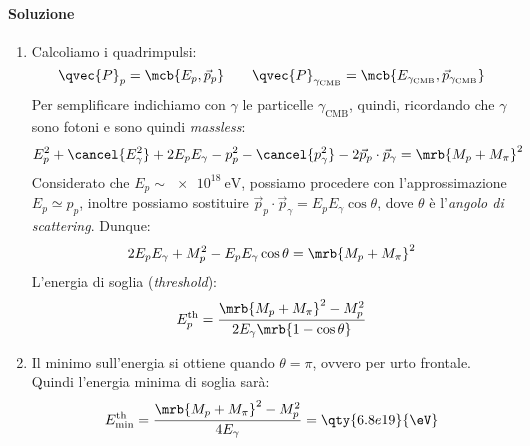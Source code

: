 \begin{example}
  \paragraph{Soluzione}
  \begin{enumerate}
    \item Calcoliamo i quadrimpulsi:
      \begin{equation}
        \qvec{P}_{p} = \mcb{E _{p}, \vec{p}_{p}}
        \qquad
        \qvec{P}_{\gamma _\text{CMB}} = \mcb{E _{\gamma _{\text{CMB}}},
        \vec{p}_{\gamma _\text{CMB}}}
      \end{equation}
      Per semplificare indichiamo con $\gamma$ le particelle $\gamma
      _\text{CMB}$, quindi, ricordando che $\gamma$ sono fotoni e sono quindi
      \textit{massless}:
      \begin{equation}
        E _{p}^{2} + \cancel{E _{\gamma}^{2}} + 2 E _{p} E _{\gamma} - p
        _{p}^{2} - \cancel{p _{\gamma}^{2}} - 2 \vec{p}_{p} \cdot
        \vec{p}_{\gamma} = \mrb{M _{p} + M _{\pi}}^{2}
      \end{equation}
      Considerato che $E _{p} \sim \qty{e18}{\eV}$, possiamo procedere con
      l'approssimazione $E _{p} \simeq p _{p}$, inoltre possiamo sostituire
      $\vec{p}_p \cdot \vec{p}_{\gamma} = E _{p} E _{\gamma} \cos \theta$, dove
      $\theta$ è l'\textit{angolo di scattering}. Dunque:
      \begin{equation}
        2 E_p E _{\gamma} + M _{p}^{2} - E _{p} E _{\gamma} \cos \theta =
        \mrb{M _{p} + M _{\pi}}^{2}
      \end{equation}
      L'energia di soglia (\textit{threshold}):
      \begin{equation}
        E _{p} ^\text{th} = \frac{\mrb{M_p + M _{\pi}}^{2} - M _{p}^{2}}{2 E
        _{\gamma} \mrb{1 - \cos \theta}}
      \end{equation}

    \item Il minimo sull'energia si ottiene quando $\theta = \pi$, ovvero per
      urto frontale. Quindi l'energia minima di soglia sarà:
      \begin{equation}
        E _\text{min}^\text{th} = \frac{\mrb{M _{p} + M _{\pi}}^{2} - M _p
        ^{2}}{4 E _{\gamma}} = \qty{6.8e19}{\eV}
      \end{equation}
  \end{enumerate}
\end{example}

